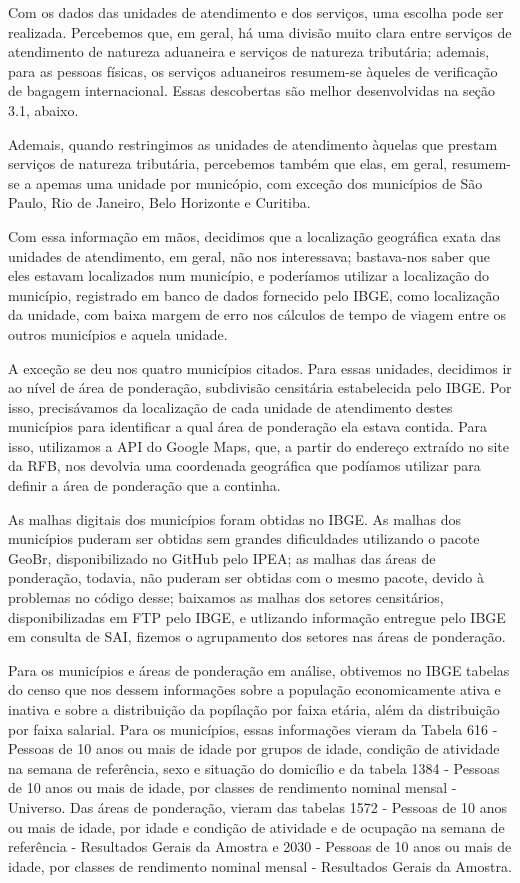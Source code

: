 \documentclass[]{article}
\begin{document}
Com os dados das unidades de atendimento e dos serviços, uma escolha
pode ser realizada. Percebemos que, em geral, há uma divisão muito clara
entre serviços de atendimento de natureza aduaneira e serviços de
natureza tributária; ademais, para as pessoas físicas, os serviços
aduaneiros resumem-se àqueles de verificação de bagagem internacional.
Essas descobertas são melhor desenvolvidas na seção 3.1, abaixo.

Ademais, quando restringimos as unidades de atendimento àquelas que
prestam serviços de natureza tributária, percebemos também que elas, em
geral, resumem-se a apemas uma unidade por municópio, com exceção dos
municípios de São Paulo, Rio de Janeiro, Belo Horizonte e Curitiba.

Com essa informação em mãos, decidimos que a localização geográfica
exata das unidades de atendimento, em geral, não nos interessava;
bastava-nos saber que eles estavam localizados num município, e
poderíamos utilizar a localização do município, registrado em banco de
dados fornecido pelo IBGE, como localização da unidade, com baixa margem
de erro nos cálculos de tempo de viagem entre os outros municípios e
aquela unidade.

A exceção se deu nos quatro municípios citados. Para essas unidades,
decidimos ir ao nível de área de ponderação, subdivisão censitária
estabelecida pelo IBGE. Por isso, precisávamos da localização de cada
unidade de atendimento destes municípios para identificar a qual área de
ponderação ela estava contida. Para isso, utilizamos a API do Google
Maps, que, a partir do endereço extraído no site da RFB, nos devolvia
uma coordenada geográfica que podíamos utilizar para definir a área de
ponderação que a continha.

As malhas digitais dos municípios foram obtidas no IBGE. As malhas dos
municípios puderam ser obtidas sem grandes dificuldades utilizando o
pacote GeoBr, disponibilizado no GitHub pelo IPEA; as malhas das áreas
de ponderação, todavia, não puderam ser obtidas com o mesmo pacote,
devido à problemas no código desse; baixamos as malhas dos setores
censitários, disponibilizadas em FTP pelo IBGE, e utlizando informação
entregue pelo IBGE em consulta de SAI, fizemos o agrupamento dos setores
nas áreas de ponderação.

Para os municípios e áreas de ponderação em análise, obtivemos no IBGE
tabelas do censo que nos dessem informações sobre a população
economicamente ativa e inativa e sobre a distribuição da popílação por
faixa etária, além da distribuição por faixa salarial. Para os
municípios, essas informações vieram da Tabela 616 - Pessoas de 10 anos
ou mais de idade por grupos de idade, condição de atividade na semana de
referência, sexo e situação do domicílio e da tabela 1384 - Pessoas de
10 anos ou mais de idade, por classes de rendimento nominal mensal -
Universo. Das áreas de ponderação, vieram das tabelas 1572 - Pessoas de
10 anos ou mais de idade, por idade e condição de atividade e de
ocupação na semana de referência - Resultados Gerais da Amostra e 2030 -
Pessoas de 10 anos ou mais de idade, por classes de rendimento nominal
mensal - Resultados Gerais da Amostra.
\end{document}
